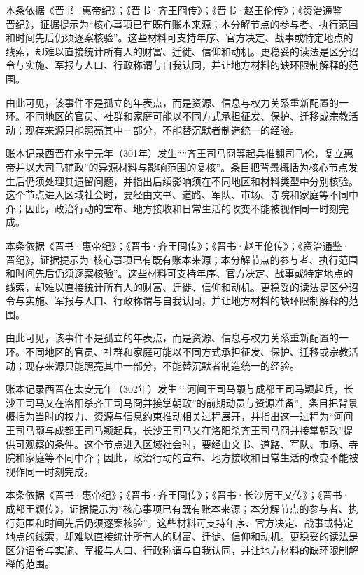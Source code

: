 本条依据《晋书·惠帝纪》；《晋书·齐王冏传》；《晋书·赵王伦传》；《资治通鉴·晋纪》，证据提示为“核心事项已有既有账本来源；本分解节点的参与者、执行范围和时间先后仍须逐案核验”。这些材料可支持年序、官方决定、战事或特定地点的线索，却难以直接统计所有人的财富、迁徙、信仰和动机。更稳妥的读法是区分诏令与实施、军报与人口、行政称谓与自我认同，并让地方材料的缺环限制解释的范围。

由此可见，该事件不是孤立的年表点，而是资源、信息与权力关系重新配置的一环。不同地区的官员、社群和家庭可能以不同方式承担征发、保护、迁移或宗教活动；现存来源只能照亮其中一部分，不能替沉默者制造统一的经验。

账本记录西晋在永宁元年（301年）发生““齐王司马冏等起兵推翻司马伦，复立惠帝并以大司马辅政”的异源材料与影响范围的复核”。条目把背景概括为核心节点发生后仍须处理其遗留问题，并指出后续影响须在不同地区和材料类型中分别核验。这个节点进入区域社会时，要经由文书、道路、军队、市场、寺院和家庭等不同中介；因此，政治行动的宣布、地方接收和日常生活的改变不能被视作同一时刻完成。

本条依据《晋书·惠帝纪》；《晋书·齐王冏传》；《晋书·赵王伦传》；《资治通鉴·晋纪》，证据提示为“核心事项已有既有账本来源；本分解节点的参与者、执行范围和时间先后仍须逐案核验”。这些材料可支持年序、官方决定、战事或特定地点的线索，却难以直接统计所有人的财富、迁徙、信仰和动机。更稳妥的读法是区分诏令与实施、军报与人口、行政称谓与自我认同，并让地方材料的缺环限制解释的范围。

由此可见，该事件不是孤立的年表点，而是资源、信息与权力关系重新配置的一环。不同地区的官员、社群和家庭可能以不同方式承担征发、保护、迁移或宗教活动；现存来源只能照亮其中一部分，不能替沉默者制造统一的经验。

账本记录西晋在太安元年（302年）发生““河间王司马颙与成都王司马颖起兵，长沙王司马乂在洛阳杀齐王司马冏并接掌朝政”的前期动员与资源准备”。条目把背景概括为当时的权力、资源与信息约束推动相关过程展开，并指出这一过程为“河间王司马颙与成都王司马颖起兵，长沙王司马乂在洛阳杀齐王司马冏并接掌朝政”提供可观察的条件。这个节点进入区域社会时，要经由文书、道路、军队、市场、寺院和家庭等不同中介；因此，政治行动的宣布、地方接收和日常生活的改变不能被视作同一时刻完成。

本条依据《晋书·惠帝纪》；《晋书·齐王冏传》；《晋书·长沙厉王乂传》；《晋书·成都王颖传》，证据提示为“核心事项已有既有账本来源；本分解节点的参与者、执行范围和时间先后仍须逐案核验”。这些材料可支持年序、官方决定、战事或特定地点的线索，却难以直接统计所有人的财富、迁徙、信仰和动机。更稳妥的读法是区分诏令与实施、军报与人口、行政称谓与自我认同，并让地方材料的缺环限制解释的范围。

